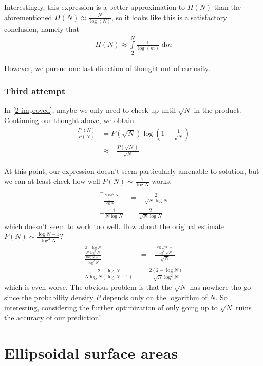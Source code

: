 \documentclass[10pt]{article}
\begin{document}
Interestingly, this expression is a better approximation to $\Pi(N)$ than the
aforementioned $\Pi(N) \approx \frac{N}{\log(N)}$, so it looks like this is a
satisfactory conclusion, namely that
\begin{align}
    \Pi(N) \approx \int\limits_{2}^{N}\frac{1}{\log(m)}\;\mathrm{d}m
\end{align}

However, we pursue one last direction of thought out of curiosity.

\subsubsection{Third attempt}

In \autoref{2-improved}, maybe we only need to check up until $\sqrt{N}$ in the
product. Continuing our thought above, we obtain
\begin{align}
    \frac{P'(N)}{P(N)} &= P(\sqrt{N})\log\left( 1 - \frac{1}{\sqrt{N}} \right)\\
    &\approx -\frac{P(\sqrt{N})}{\sqrt{N}}
\end{align}

At this point, our expression doesn't seem particularly amenable to solution,
but we can at least check how well $P(N) \sim \frac{1}{\log N}$ works:
\begin{align}
    \frac{-\frac{1}{N\log^2N}}{\frac{1}{\log N}} &= -\frac{2}{\sqrt{N}\log N}\\
    -\frac{1}{N\log N} &= \frac{2}{\sqrt{N}\log N}
\end{align}
which doesn't seem to work too well. How about the original estimate $P(N) \sim
\frac{\log N - 1}{\log^2 N}$?
\begin{align}
    \frac{\frac{2 - \log N}{N\log^3 N}}{\frac{\log N - 1}{\log^2 N}} &=
    - \frac{\frac{\log\sqrt{N} - 1}{\log^2\sqrt{N}}}{\sqrt{N}}\\
    \frac{2 - \log N}{N\log N \left( \log N - 1 \right)} &= \frac{2\left( 2 -
    \log N\right)}{\sqrt{N}\log^2 N}
\end{align}
which is even worse. The obvious problem is that the $\sqrt{N}$ has nowhere tho
go since the probability density $P$ depends only on the logarithm of $N$. So
interesting, considering the further optimization of only going up to $\sqrt{N}$
ruins the accuracy of our prediction!

\clearpage
\section{Ellipsoidal surface areas}
\end{document}
